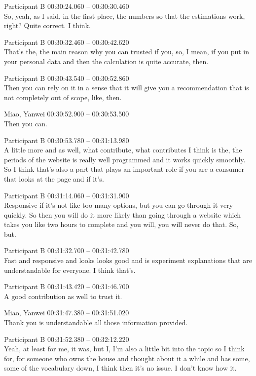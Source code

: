 {Participant B 00:30:24.060 -- 00:30:30.460 \\
So, yeah, as I said, in the first place, the numbers so that the estimations work, right? Quite correct. I think.

Participant B 00:30:32.460 -- 00:30:42.620 \\
That's the, the main reason why you can trusted if you, so, I mean, if you put in your personal data and then the calculation is quite accurate, then.

Participant B 00:30:43.540 -- 00:30:52.860 \\
Then you can rely on it in a sense that it will give you a recommendation that is not completely out of scope, like, then.

Miao, Yanwei 00:30:52.900 -- 00:30:53.500 \\
Then you can.

Participant B 00:30:53.780 -- 00:31:13.980 \\
A little more and as well, what contribute, what contributes I think is the, the periods of the website is really well programmed and it works quickly smoothly. So I think that's also a part that plays an important role if you are a consumer that looks at the page and if it's.

Participant B 00:31:14.060 -- 00:31:31.900 \\
Responsive if it's not like too many options, but you can go through it very quickly. So then you will do it more likely than going through a website which takes you like two hours to complete and you will, you will never do that. So, but.

Participant B 00:31:32.700 -- 00:31:42.780 \\
Fast and responsive and looks looks good and is experiment explanations that are understandable for everyone. I think that's.

Participant B 00:31:43.420 -- 00:31:46.700 \\
A good contribution as well to trust it.

Miao, Yanwei 00:31:47.380 -- 00:31:51.020 \\
Thank you is understandable all those information provided.

Participant B 00:31:52.380 -- 00:32:12.220 \\
Yeah, at least for me, it was, but I, I'm also a little bit into the topic so I think for, for someone who owns the house and thought about it a while and has some, some of the vocabulary down, I think then it's no issue. I don't know how it.

}
